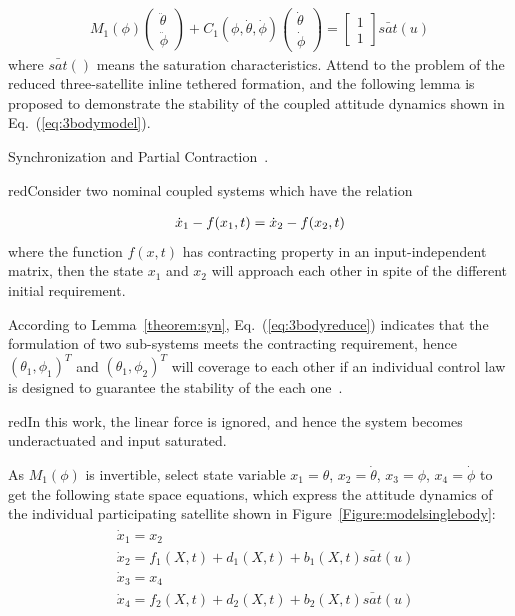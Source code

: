 \begin{align}
M_1(\phi)
\begin{pmatrix}
\ddot{\theta}\\
\ddot{\phi}
\end{pmatrix}
+C_1(\phi,\dot{\theta},\dot{\phi})
\begin{pmatrix}
\dot{\theta}\\
\dot{\phi}
\end{pmatrix}
=
\begin{bmatrix}
1\\
1
\end{bmatrix}\bar{sat}(u)\label{eq:individualsys}
\end{align}
where $\bar{sat}()$ means the saturation characteristics. Attend to the problem of the reduced three-satellite inline tethered formation, and the following lemma is proposed to demonstrate the stability of the coupled attitude dynamics shown in Eq.~(\ref{eq:3bodymodel}).
\begin{lemma}
Synchronization and Partial Contraction~\cite{wang2005partial}. \begin{color}{red}Consider two nominal coupled systems which have the relation\end{color}
\begin{align}
\dot{x}_1-f(x_1,t)=\dot{x}_2-f(x_2,t)\notag
\end{align}
where the function $f(x,t)$ has contracting property in an input-independent matrix, then the state $x_1$ and $x_2$ will approach each other in spite of the different initial requirement.\label{theorem:syn}
\end{lemma}\par
According to Lemma~\ref{theorem:syn}, Eq.~(\ref{eq:3bodyreduce}) indicates that the formulation of two sub-systems meets the contracting requirement, hence $(\theta_1,\phi_1)^T$ and $(\theta_1,\phi_2)^T$ will coverage to each other if an individual control law is designed to guarantee the stability of the each one~\cite{huang2015nonlinear}.\par
\begin{color}{red}In this work, the linear force is ignored, and hence the system becomes underactuated and input saturated.\end{color}
As $M_1(\phi)$ is invertible, select state variable $x_1=\theta$, $x_2=\dot\theta$, $x_3=\phi$, $x_4=\dot\phi$ to get the following state space equations, which express the attitude dynamics of the individual participating satellite shown in Figure~\ref{Figure:modelsinglebody}:
\begin{align}
\begin{split}
&\dot x_1 = x_2\\
&\dot x_2 = f_1(X,t)+d_1(X,t)+b_1(X,t)\bar{sat}(u)\\
&\dot x_3 = x_4\\
&\dot x_4 = f_2(X,t)+d_2(X,t)+b_2(X,t)\bar{sat}(u)
\end{split}\label{eq:model}
\end{align}

